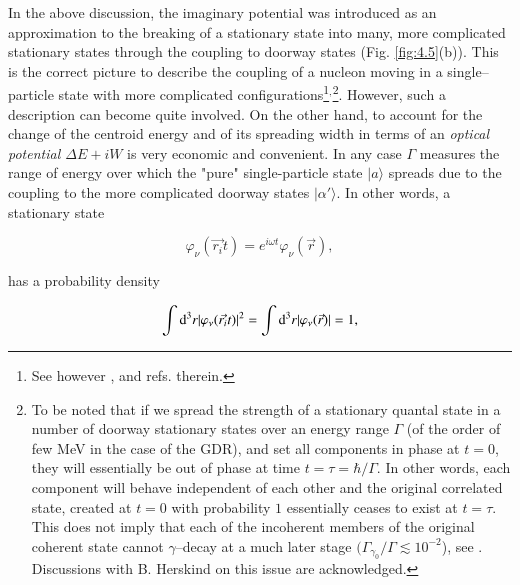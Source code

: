 In the above discussion, the imaginary potential was introduced as an approximation to  the breaking of a stationary state into many, more complicated stationary states through the coupling to doorway states (Fig. \ref{fig:4.5}(b)). This is the  correct picture to describe the coupling of a nucleon moving in a single--particle state with more complicated configurations\footnote{See however \cite{Caldeira:81}, \cite{Caldeira:83} and refs. therein.}$^,$\footnote{To be noted that if we spread the strength of a stationary quantal state in a number of doorway stationary states over an energy range $\Gamma$ (of the order of few MeV in the case of the GDR), and set all components in phase at $t=0$, they will essentially be out of phase at time $t=\tau = \hbar/\Gamma$. In other words, each component will behave independent of each other and the original correlated state, created at $t=0$ with probability $1$ essentially ceases to exist at $t=\tau$. This does not imply that each of the incoherent members of the original coherent state cannot $\gamma$--decay at a much later stage $(\Gamma_{\gamma_0}/\Gamma\lesssim10^{-2}$), see \cite{Bortignon:98}. Discussions with B. Herskind on this issue are acknowledged.}. However, such a description can become quite involved. On the other hand, to account for the change of the centroid energy and of its spreading width in terms of an {\it optical potential $\Delta E + iW$} is very economic and convenient. In any case $\Gamma$ measures the range of energy over which the "pure" single-particle state $|a\rangle$ spreads due to the coupling to the more complicated doorway states $|\alpha'\rangle$. In other words, a stationary state

\begin{equation}
\varphi_{\nu}(\vec{r_i}t) = e^{i\omega t} \varphi_{\nu}(\vec{r}) ,
\label{eqn:43}
\end{equation}

\noindent has a probability density

\begin{equation}
\int{\rm d}^3 r |\varphi_{\nu}(\vec{r_i}t)|^2 = \int{\rm d}^3 r |\varphi_{\nu}(\vec{r})| = 1 ,
\label{eqn:44}
\end{equation}

